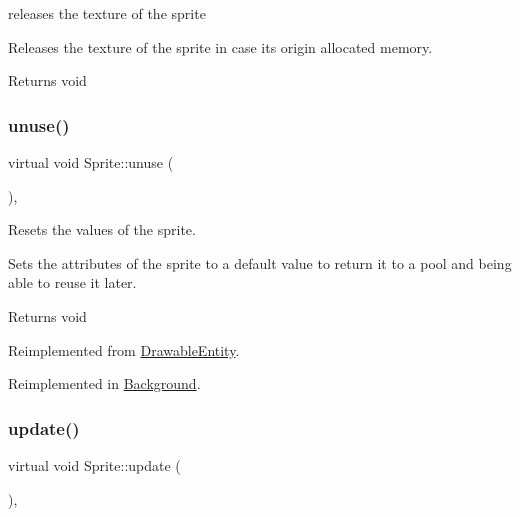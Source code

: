 releases the texture of the sprite 

Releases the texture of the sprite in case it\textquotesingle{}s origin allocated memory.

\begin{DoxyReturn}{Returns}
void 
\end{DoxyReturn}
\mbox{\label{class_sprite_a26066db75daec637f436d4635418059a}} 
\subsubsection{\texorpdfstring{unuse()}{unuse()}}
{\footnotesize\ttfamily virtual void Sprite\+::unuse (\begin{DoxyParamCaption}{ }\end{DoxyParamCaption})\hspace{0.3cm}{\ttfamily [override]}, {\ttfamily [virtual]}}



Resets the values of the sprite. 

Sets the attributes of the sprite to a default value to return it to a pool and being able to reuse it later.

\begin{DoxyReturn}{Returns}
void 
\end{DoxyReturn}


Reimplemented from \hyperlink{class_drawable_entity_aabea8715834f6cee7fd36b038d1a4843}{Drawable\+Entity}.



Reimplemented in \hyperlink{class_background_ad3559e8684aca155ae68d53374f3540d}{Background}.

\mbox{\label{class_sprite_a1070fccd6830382b72e3f3a8785afc8c}} 
\subsubsection{\texorpdfstring{update()}{update()}}
{\footnotesize\ttfamily virtual void Sprite\+::update (\begin{DoxyParamCaption}{ }\end{DoxyParamCaption})\hspace{0.3cm}{\ttfamily [override]}, {\ttfamily [virtual]}}



